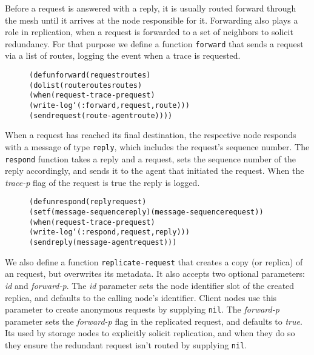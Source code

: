 \documentclass [a4paper,12pt,oneside]{article}\usepackage [paper=a4paper,left=37.5264mm,right=37.5264mm,top=37.5264mm,bottom=37.5264mm]{geometry}\usepackage {graphicx}\usepackage {tabularx}\usepackage {alltt}\usepackage {float}\usepackage [section]{placeins}\usepackage {titling}\setlength {\droptitle }{-4em}\pretitle {\begin {flushright}\bfseries \LARGE }\posttitle {\end {flushright}}\preauthor {\begin {flushright}}\postauthor {\end {flushright}}\predate {\begin {flushright}}\postdate {\end {flushright}}\usepackage [english]{babel}\usepackage [T1]{fontenc}\usepackage [utf8x]{inputenc}\usepackage {stmaryrd}\usepackage {amsfonts}\DeclareUnicodeCharacter {12314}{$\llbracket $}\DeclareUnicodeCharacter {12315}{$\rrbracket $}\DeclareUnicodeCharacter {9655}{$\rhd $}\newcommand \nobreakdash {\mbox {-}}\DeclareUnicodeCharacter {8209}{\nobreakdash }\usepackage [sc]{mathpazo}\linespread {1.05}\usepackage [font={small},labelformat=empty,labelsep=none]{caption}\tolerance=10000 \clubpenalty=10000 \widowpenalty=10000 \frenchspacing
\begin{document}
Before a request is answered with a reply, it is usually routed forward through the mesh until it arrives at the node responsible for it. Forwarding also plays a role in replication, when a request is forwarded to a set of neighbors to solicit redundancy. For that purpose we define a function \texttt {forward} that sends a request via a list of routes, logging the event when a trace is requested.

\begin {figure}[H]\centering \begin {alltt}
(defun forward (request routes)
  (dolist (route routes routes)
    (when (request-trace-p request)
      (write-log `(:forward ,request ,route)))
    (send request (route-agent route))))
\end{alltt}\vspace {-1em}\end {figure}

When a request has reached its final destination, the respective node responds with a message of type \texttt {reply}, which includes the request’s sequence number. The \texttt {respond} function takes a reply and a request, sets the sequence number of the reply accordingly, and sends it to the agent that initiated the request. When the \textit {trace-p} flag of the request is true the reply is logged.

\begin {figure}[H]\centering \begin {alltt}
(defun respond (reply request)
  (setf (message-sequence reply) (message-sequence request))
  (when (request-trace-p request)
    (write-log `(:respond ,request ,reply)))
  (send reply (message-agent request)))
\end{alltt}\vspace {-1em}\end {figure}

We also define a function \texttt {replicate-request} that creates a copy (or replica) of an request, but overwrites its metadata. It also accepts two optional parameters: \textit {id} and \textit {forward-p}. The \textit {id} parameter sets the node identifier slot of the created replica, and defaults to the calling node’s identifier. Client nodes use this parameter to create anonymous requests by supplying \texttt {nil}. The \textit {forward-p} parameter sets the \textit {forward-p} flag in the replicated request, and defaults to \textit {true}. Its used by storage nodes to explicitly solicit replication, and when they do so they ensure the redundant request isn’t routed by supplying \texttt {nil}.
\end{document}
